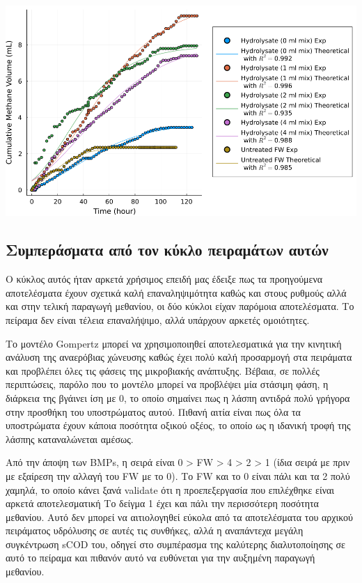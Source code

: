\documentclass[11pt]{article}
\begin{document}
\begin{center}
\includegraphics[width=.9\linewidth]{../plots/BMPs/methane_s1_r2_comp.png}
\end{center}

\subsection{Συμπεράσματα από τον κύκλο πειραμάτων αυτών}
\label{sec:org7322e63}
Ο κύκλος αυτός ήταν αρκετά χρήσιμος επειδή μας έδειξε πως τα προηγούμενα αποτελέσματα έχουν σχετικά καλή επαναληψιμότητα καθώς και στους ρυθμούς αλλά και στην τελική παραγωγή μεθανίου, οι δύο κύκλοι είχαν παρόμοια αποτελέσματα. Το πείραμα δεν είναι τέλεια επαναλήψιμο, αλλά υπάρχουν αρκετές ομοιότητες.

Το μοντέλο Gompertz μπορεί να χρησιμοποιηθεί αποτελεσματικά για την κινητική ανάλυση της αναερόβιας χώνευσης καθώς έχει πολύ καλή προσαρμογή στα πειράματα και προβλέπει όλες τις φάσεις της μικροβιακής ανάπτυξης. Βέβαια, σε πολλές περιπτώσεις, παρόλο που το μοντέλο μπορεί να προβλέψει μία στάσιμη φάση, η διάρκεια της βγάινει ίση με 0, το οποίο σημαίνει πως η λάσπη αντιδρά πολύ γρήγορα στην προσθήκη του υποστρώματος αυτού. Πιθανή αιτία είναι πως όλα τα υποστρώματα έχουν κάποια ποσότητα οξικού οξέος, το οποίο ως η ιδανική τροφή της λάσπης καταναλώνεται αμέσως.

Από την άποψη των BMPs, η σειρά είναι 0 > FW > 4 > 2 > 1 (ίδια σειρά με πριν με εξαίρεση την αλλαγή του FW με το 0). Το FW και το 0 είναι πάλι και τα 2 πολύ χαμηλά, το οποίο κάνει ξανά validate ότι η προεπεξεργασία που επιλέχθηκε είναι αρκετά αποτελεσματική Το δείγμα 1 έχει και πάλι την περισσότερη ποσότητα μεθανίου. Αυτό δεν μπορεί να αιτιολογηθεί εύκολα από τα αποτελέσματα του αρχικού πειράματος υδρόλυσης σε αυτές τις συνθήκες, αλλά η αναπάντεχα μεγάλη συγκέντρωση sCOD του, οδηγεί στο συμπέρασμα της καλύτερης διαλυτοποίησης σε αυτό το πείραμα και πιθανόν αυτό να ευθύνεται για την αυξημένη παραγωγή μεθανίου.
\end{document}
